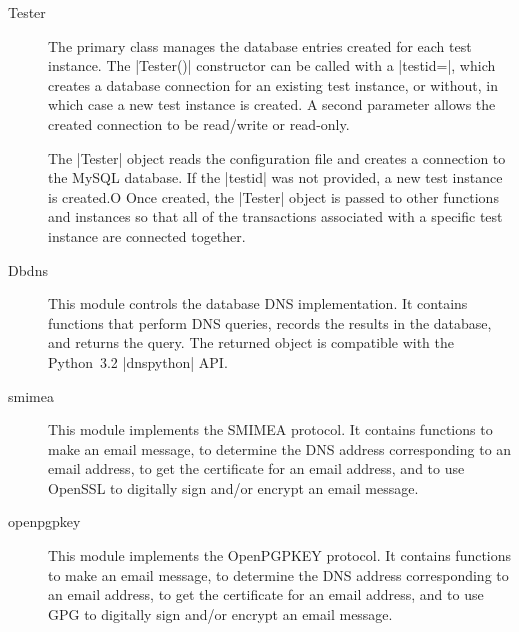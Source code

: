 \documentclass[preprint,3p]{elsarticle}
\begin{document}
\begin{description}
\item[Tester] The primary class manages the database entries
created for each test instance. The |Tester()| constructor can be
called with a |testid=|, which creates a database connection for an
existing test instance, or without, in which case a new test instance
is created. A second parameter allows the created connection to be
read/write or read-only.

The |Tester| object reads the configuration file and creates a
connection to the MySQL database. If the |testid| was not provided, a
new test instance is created.O Once created, the |Tester| object is
passed to other functions and instances so that all of the
transactions associated with a specific test instance are connected
together.

\item[Dbdns] This module controls the database DNS
implementation. It contains functions that perform DNS queries,
records the results in the database, and returns the query. The
returned object  is compatible with the Python~3.2 |dnspython| API.

\item[smimea] This module implements the SMIMEA protocol. It contains
  functions to make an email message, to determine the DNS address
  corresponding to an email address, to get the certificate for an
  email address, and to use OpenSSL to digitally sign and/or encrypt
  an email message.

\item[openpgpkey] This module implements the OpenPGPKEY protocol. It contains
  functions to make an email message, to determine the DNS address
  corresponding to an email address, to get the certificate for an
  email address, and to use GPG to digitally sign and/or encrypt
  an email message.

\end{description}
\end{document}
